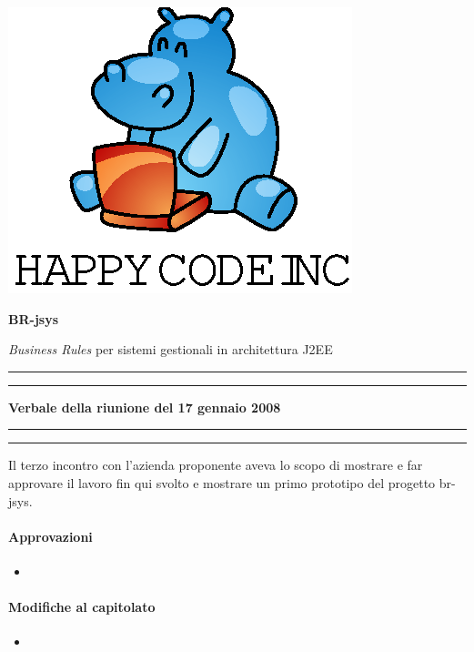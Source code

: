 \documentclass[11pt,titlepage,a4paper]{report}
\begin{document}
\begin{titlepage}
\begin{center}
\vspace*{0.5in}
\includegraphics{logo.eps}
\vspace*{0.2in}

{\Large \textbf{BR-jsys}}

{\Large \emph{Business Rules} per sistemi gestionali in architettura J2EE } 
\vspace{1.3in}
\par\rule{10cm}{.4pt} \par
\par\rule{12cm}{1pt} \par
\vspace*{0.5in}
\LARGE \textbf {Verbale della riunione del 17 gennaio 2008}
\vspace*{0.5in}
\par\rule{12cm}{1pt} \par
\par\rule{10cm}{.4pt} \par

\end{center}
\end{titlepage}
\vspace*{0.5in}
Il terzo incontro con l'azienda proponente aveva lo scopo di mostrare e far approvare il lavoro fin qui svolto e mostrare un primo prototipo del progetto br-jsys.
\thispagestyle{plain}

\paragraph{Approvazioni}
\begin{itemize}
\item \ 
\end{itemize}

\paragraph{Modifiche al capitolato}
\begin{itemize}

\item \

\end{itemize}
\end{document}

